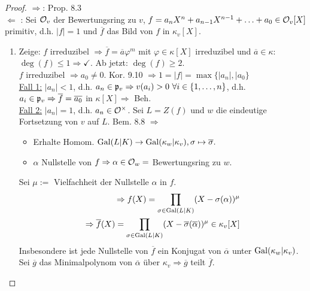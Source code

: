 
\begin{proof}
\glqq $\Rightarrow$\grqq: Prop. 8.3\\
\glqq $\Leftarrow$ \grqq: Sei $\mathcal{O}_v$ der Bewertungsring zu $v$, $f=a_nX^n+a_{n-1}X^{n-1}+ \ldots+a_0 \in \mathcal{O}_v[X]$ primitiv, d.h. $|f|=1$ und $\overline{f}$ das Bild von $f$ in $\kappa_v[X]$.
\begin{enumerate}[(1)]
\item Zeige: $f$ irreduzibel $\Rightarrow \overline{f}=\overline{a} \varphi^m$ mit $\varphi \in \kappa[X]$ irreduzibel und $\overline{a} \in \kappa$:\\
$\deg(f) \leq 1 \Rightarrow \checkmark$. Ab jetzt: $\deg(f) \geq 2$.\\
$f$ irreduzibel $\Rightarrow  a_0 \neq 0$. Kor. 9.10 $\Rightarrow 1=|f|=\max\{|a_n|, |a_0\}$\\
\underline{Fall 1:} $|a_n|<1$, d.h. $a_n \in \p_v \Rightarrow v(a_i)>0 \ \forall i \in \{1, \ldots, n\}$, d.h. $a_i \in \mathfrak{p}_v \Rightarrow \overline{f}= \overline{a_0}$ in $\kappa[X] \Rightarrow$ Beh.\\
\underline{Fall 2:} $|a_n|=1$, d.h. $a_n \in \mathcal{O}^\times$. Sei $L=Z(f)$ und $w$ die eindeutige Fortsetzung von $v$ auf $L$. Bem. 8.8 $\Rightarrow$
\begin{itemize}
\item Erhalte Homom. $\operatorname{Gal}(L|K) \to \operatorname{Gal}(\kappa_w|\kappa_v) , \sigma \mapsto \overline{\sigma}.$
\item $\alpha$ Nullstelle von $f \Rightarrow \alpha \in \mathcal{O}_w=$ Bewertungsring zu $w$.
\end{itemize}
Sei $\mu:=$ Vielfachheit der Nullstelle $\alpha$ in $f$.
\begin{align*}
\Rightarrow f(X)=\prod_{\sigma\in \operatorname{Gal}(L|K)} (X-\sigma(\alpha))^\mu\\
\Rightarrow \overline{f}(X)=\prod_{\sigma\in \operatorname{Gal}(L|K)} (X-\overline{\sigma}(\overline{\alpha}))^\mu \in \kappa_v[X]\\
\end{align*}
Insbesondere ist jede Nullstelle von $\overline{f}$ ein Konjugat von $\overline{\alpha}$ unter $\operatorname{Gal}(\kappa_w|\kappa_v)$. Sei $\overline{g}$ das Minimalpolynom von $\overline{\alpha}$ über $\kappa_v \Rightarrow \overline{g}$ teilt $\overline{f}$.


\end{enumerate}
\end{proof}
